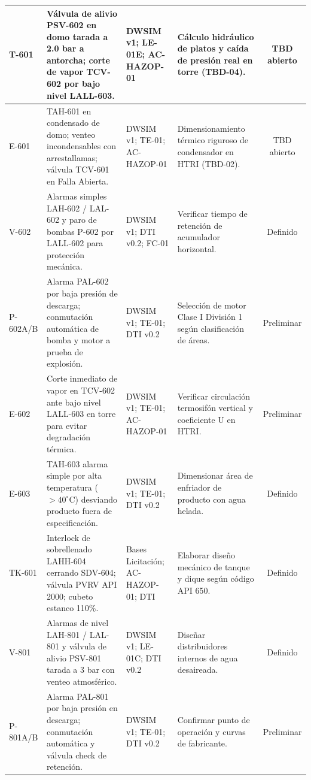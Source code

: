 \documentclass[10pt,letterpaper]{article}
\begin{document}
\begin{landscape}
\begin{xltabular}{\linewidth}{|l|p{6.0cm}|p{3.2cm}|p{4.2cm}|c|}
T-601 & Válvula de alivio PSV-602 en domo tarada a 2.0 bar a antorcha; corte de vapor TCV-602 por bajo nivel LALL-603. & DWSIM v1; LE-01E; AC-HAZOP-01 & Cálculo hidráulico de platos y caída de presión real en torre (TBD-04). & TBD abierto \\ \hline
E-601 & TAH-601 en condensado de domo; venteo incondensables con arrestallamas; válvula TCV-601 en Falla Abierta. & DWSIM v1; TE-01; AC-HAZOP-01 & Dimensionamiento térmico riguroso de condensador en HTRI (TBD-02). & TBD abierto \\ \hline
V-602 & Alarmas simples LAH-602 / LAL-602 y paro de bombas P-602 por LALL-602 para protección mecánica. & DWSIM v1; DTI v0.2; FC-01 & Verificar tiempo de retención de acumulador horizontal. & Definido \\ \hline
P-602A/B & Alarma PAL-602 por baja presión de descarga; conmutación automática de bomba y motor a prueba de explosión. & DWSIM v1; TE-01; DTI v0.2 & Selección de motor Clase I División 1 según clasificación de áreas. & Preliminar \\ \hline
E-602 & Corte inmediato de vapor en TCV-602 ante bajo nivel LALL-603 en torre para evitar degradación térmica. & DWSIM v1; TE-01; AC-HAZOP-01 & Verificar circulación termosifón vertical y coeficiente U en HTRI. & Preliminar \\ \hline
E-603 & TAH-603 alarma simple por alta temperatura ($>40^\circ\text{C}$) desviando producto fuera de especificación. & DWSIM v1; TE-01; DTI v0.2 & Dimensionar área de enfriador de producto con agua helada. & Definido \\ \hline
TK-601 & Interlock de sobrellenado LAHH-604 cerrando SDV-604; válvula PVRV API 2000; cubeto estanco 110\%. & Bases Licitación; AC-HAZOP-01; DTI & Elaborar diseño mecánico de tanque y dique según código API 650. & Definido \\ \hline
V-801 & Alarmas de nivel LAH-801 / LAL-801 y válvula de alivio PSV-801 tarada a 3 bar con venteo atmosférico. & DWSIM v1; LE-01C; DTI v0.2 & Diseñar distribuidores internos de agua desaireada. & Definido \\ \hline
P-801A/B & Alarma PAL-801 por baja presión en descarga; conmutación automática y válvula check de retención. & DWSIM v1; TE-01; DTI v0.2 & Confirmar punto de operación y curvas de fabricante. & Preliminar \\ \hline
\end{xltabular}
\end{landscape}

\newpage
\end{document}
